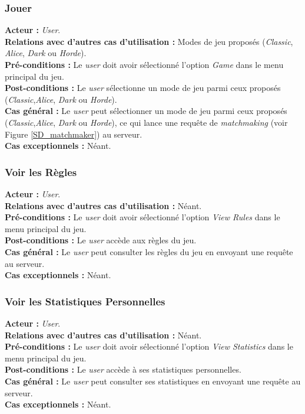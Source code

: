 \documentclass[10pt, a4paper]{article}
\begin{document}
\subsubsection{Jouer}
\textbf{Acteur :} \textit{User}.\\
\textbf{Relations avec d'autres cas d'utilisation :} Modes de jeu proposés (\textit{Classic}, \textit{Alice}, \textit{Dark} ou \textit{Horde}).\\
\textbf{Pré-conditions :} Le \textit{user} doit avoir sélectionné l'option \textit{Game} dans le menu principal du jeu.\\
\textbf{Post-conditions :} Le  \textit{user} sélectionne un mode de jeu parmi ceux proposés (\textit{Classic},\textit{Alice}, \textit{Dark} ou \textit{Horde}).\\
\textbf{Cas général :} Le  \textit{user} peut sélectionner un mode de jeu parmi ceux proposés (\textit{Classic},\textit{Alice}, \textit{Dark} ou \textit{Horde}), ce qui lance une requête de \textit{matchmaking} (voir Figure \ref{SD_matchmaker}) au serveur.\\
\textbf{Cas exceptionnels :} Néant.



\subsubsection{Voir les Règles}
\textbf{Acteur :} \textit{User}.\\
\textbf{Relations avec d'autres cas d'utilisation :} Néant.\\
\textbf{Pré-conditions :} Le \textit{user} doit avoir sélectionné l'option \textit{View Rules} dans le menu principal du jeu.\\
\textbf{Post-conditions :} Le \textit{user} accède aux règles du jeu.\\
\textbf{Cas général :} Le \textit{user} peut consulter les règles du jeu en envoyant une requête au serveur.\\
\textbf{Cas exceptionnels :} Néant.

\subsubsection{Voir les Statistiques Personnelles}
\textbf{Acteur :} \textit{User}.\\
\textbf{Relations avec d'autres cas d'utilisation :} Néant.\\
\textbf{Pré-conditions :} Le \textit{user} doit avoir sélectionné l'option \textit{View Statistics} dans le menu principal du jeu.\\
\textbf{Post-conditions :} Le \textit{user} accède à ses statistiques personnelles.\\
\textbf{Cas général :} Le \textit{user} peut consulter ses statistiques en envoyant une requête au serveur.\\
\textbf{Cas exceptionnels :} Néant.
\end{document}
